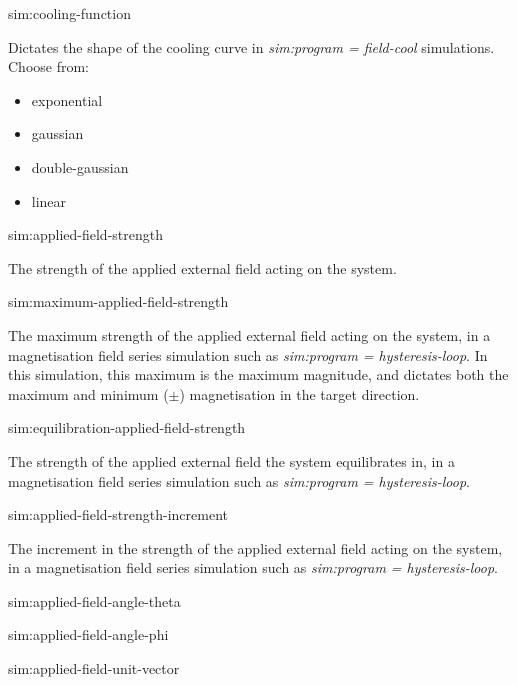 {\zicf sim:cooling-function} Dictates the shape of the cooling curve in \textit{sim:program = field-cool} simulations. Choose from:

\begin{itemize}
    \item[] exponential
    \item[] gaussian
    \item[] double-gaussian
    \item[] linear
\end{itemize}

{\zicf sim:applied-field-strength} The strength of the applied external field acting on the system.

{\zicf  sim:maximum-applied-field-strength}
The maximum strength of the applied external field acting on the system, in a magnetisation field series simulation such as \textit{sim:program = hysteresis-loop}. In this simulation, this maximum is the maximum magnitude, and dictates both the maximum and minimum ($\pm$) magnetisation in the target direction.

{\zicf sim:equilibration-applied-field-strength}
   The strength of the applied external field the system equilibrates in, in a magnetisation field series simulation such as \textit{sim:program = hysteresis-loop}.

{\zicf sim:applied-field-strength-increment}
   The increment in the strength of the applied external field acting on the system, in a magnetisation field series simulation such as \textit{sim:program = hysteresis-loop}.

{\zicf sim:applied-field-angle-theta}

{\zicf sim:applied-field-angle-phi}

{\zicf sim:applied-field-unit-vector}

